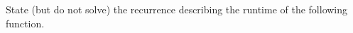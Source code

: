\Needspace{3in}
\begin{prob}
    State (but do not solve) the recurrence describing the runtime of the following function.

    \inputminted{python}{\thisdir/code.py}

\end{prob}

